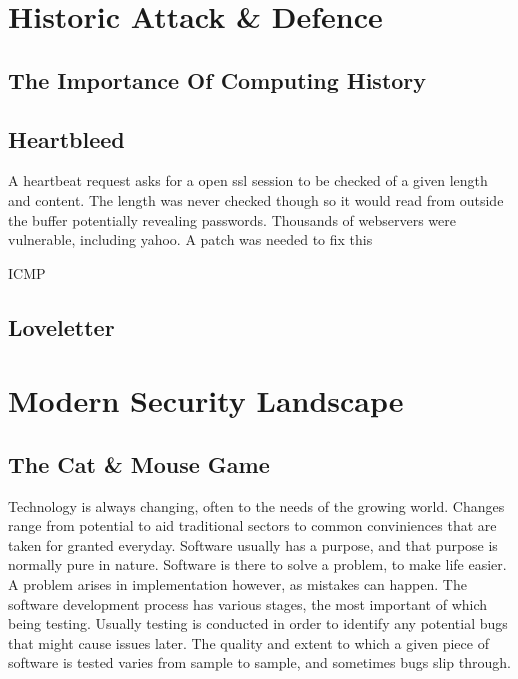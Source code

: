 


\chapter{Historic Attack \& Defence}
\section{The Importance Of Computing History}
\section{Heartbleed}
A heartbeat request asks for a open ssl session to be checked of a given length and content. The length was never checked though so it would read from outside the buffer potentially revealing passwords. Thousands of webservers were vulnerable, including yahoo. A patch was needed to fix this

ICMP \citep{ICMP}
\section{Loveletter}


\chapter{Modern Security Landscape}
\section{The Cat \& Mouse Game}
Technology is always changing, often to the needs of the growing world. Changes range from potential to aid traditional sectors to common conviniences that are taken for granted everyday.
Software usually has a purpose, and that purpose is normally pure in nature. Software is there to solve a problem, to make life easier. A problem arises in implementation however, as mistakes can happen.
The software development process has various stages, the most important of which being testing. Usually testing is conducted in order to identify any potential bugs that might cause issues later.
The quality and extent to which a given piece of software is tested varies from sample to sample, and sometimes bugs slip through.

